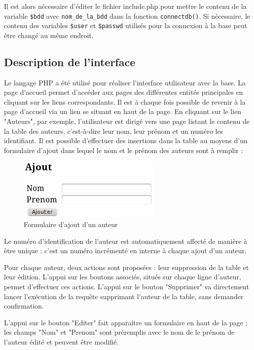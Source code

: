 \documentclass[12pt]{article}
\begin{document}
Il est alors nécessaire d'éditer le fichier include.php pour mettre le contenu
de la variable \verb!$bdd! avec \verb!nom_de_la_bdd! dans la fonction
\verb!connectdb()!. Si nécessaire, le contenu des variables \verb!$user! et
\verb!$passwd! utilisés pour la connexion à la base peut être changé au même
endroit.


\subsection{Description de l'interface}

Le langage PHP a été utilisé pour réaliser l'interface utilisateur avec la
base. La page d'accueil permet d'accéder aux pages des différentes entités
principales en cliquant sur les liens correspondants. Il est à chaque fois possible de revenir à la page d'accueil via un lien se situant en haut de la page. En cliquant sur le lien "Auteurs", par exemple, l'utilisateur est dirigé vers une page listant le contenu de la table des auteurs, c'est-à-dire leur nom, leur prénom et un numéro les identifiant. Il est possible d'effectuer des insertions dans la table au moyens d'un formulaire d'ajout dans lequel le nom et le prénom des auteurs sont à remplir :

\begin{figure}[h!]
\begin{center}
\noindent\includegraphics[]{formulaire-ajout-auteur}
  \caption{Formulaire d'ajout d'un auteur}
\end{center}
\end{figure}

Le numéro d'identification de l'auteur est automatiquement affecté de manière
à être unique : c'est un numéro incrémenté en interne à chaque ajout d'un
auteur.

Pour chaque auteur, deux actions sont proposées : leur suppression de la table
et leur édition. L'appui sur les boutons associés, situés sur chaque ligne
d'auteur, permet d'effectuer ces actions. L'appui sur le bouton "Supprimer" va
directement lancer l'exécution de la requête supprimant l'auteur de la table,
sans demander confirmation.

L'appui sur le bouton "Editer" fait apparaître un formulaire en haut de la
page ; les champs "Nom" et "Prenom" sont préremplis avec le nom de le prénom
de l'auteur édité et peuvent être modifié.
\end{document}
